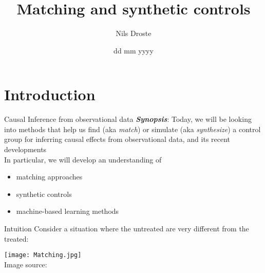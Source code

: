\documentclass[aspectratio=169]{beamer}
\title[Causal Inference]{Matching and synthetic controls \newline}
\author{Nils Droste}
\subtitle{}
\date{dd mm yyyy}
\institute{Lund University\\Department for Political Science}
\begin{document}

\titleframe


\section{Introduction}

	\begin{frame}{Causal Inference from observational data}
		\textbf{\textit{Synopsis}}: Today, we will be looking into methods that help us find (aka \textit{match}) or simulate (aka \textit{synthesize}) a control group for  inferring causal effects from observational data, and its recent developments \\ \vspace*{.25cm}
		In particular, we will develop an understanding of\\ \vspace*{.25cm}
		\begin{itemize}
			\item<2-> matching approaches
			\item<3-> synthetic controls
			\item<4-> machine-based learning methods
		\end{itemize}
	\end{frame}

	\begin{frame}{Intuition}
		Consider a situation where the untreated are very different from the treated:
		\\ \vspace*{.05cm}
		\begin{center}
			\texttt{[image: Matching.jpg]}
			\\\tiny{ Image source: \cite{Schleicher2020}}
		\end{center}
	\end{frame}
\end{document}
